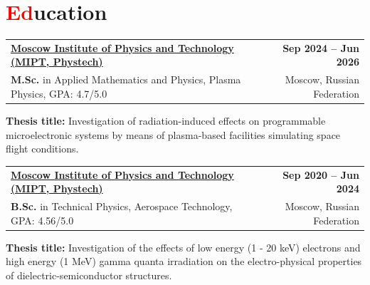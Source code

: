 \documentclass[a4paper,11pt]{article}
\makeatletter
\newcommand{\resumesection}[2]{\section{\textcolor{red}{#1}#2}}
\newcommand{\resumeSubHeadingListStart}{\begin{itemize}[leftmargin=0.0in, label={}, itemsep=2pt]}
\newcommand{\resumeSubHeadingListEnd}{\end{itemize}}
\newcommand{\resumeItem}[1]{
    \item\small{#1}
}
\newcommand{\resumeSubheading}[4]{
    \item
    \begin{tabular*}{1.0\textwidth}[t]{l@{\extracolsep{\fill}}r}
        \textbf{#1} & \textbf{\small #2} \\
        \small#3 & \small #4
    \end{tabular*}
}
\makeatother
\begin{document}
{\setlength{\tabcolsep}{0pt}
\resumesection{Ed}{ucation}

\resumeSubHeadingListStart
    \resumeSubheading
        {\href{https://mipt.ru/}{Moscow Institute of Physics and Technology (MIPT, Phystech)}}{Sep 2024 -- Jun 2026}
        {\textbf{M.Sc.} in Applied Mathematics and Physics, Plasma Physics, GPA: 4.7/5.0}{Moscow, Russian Federation}
        {\resumeItem{\textbf{Thesis title:} Investigation of radiation-induced effects on programmable microelectronic systems by means of plasma-based facilities simulating space flight conditions.}}
    \resumeSubheading
        {\href{https://mipt.ru/}{Moscow Institute of Physics and Technology (MIPT, Phystech)}}{Sep 2020 -- Jun 2024}
        {\textbf{B.Sc.} in Technical Physics, Aerospace Technology, GPA: 4.56/5.0}{Moscow, Russian Federation}
        {\resumeItem{\textbf{Thesis title:} Investigation of the effects of low energy (1 - 20 keV) electrons and high energy (1 MeV) gamma quanta irradiation on the electro-physical properties of dielectric-semiconductor structures.}}
\resumeSubHeadingListEnd

}
\end{document}
